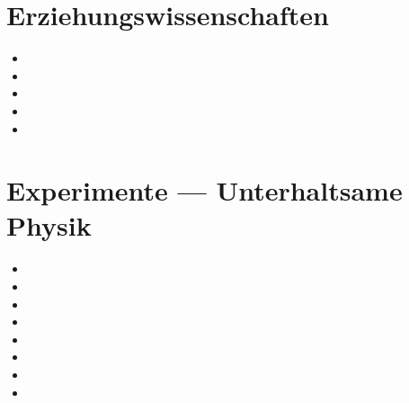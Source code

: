 \section{Erziehungswissenschaften}
\begin{itemize}
	\item {}
	\item {}
	\item {}
	\item {}
	\item {}
\end{itemize}



\section{Experimente --- Unterhaltsame Physik}
\begin{itemize}
	\item {}
	\item {}
	\item {}
	\item {}
	\item {}
	\item {}
	\item {}
	\item {}
\end{itemize}


%
%
